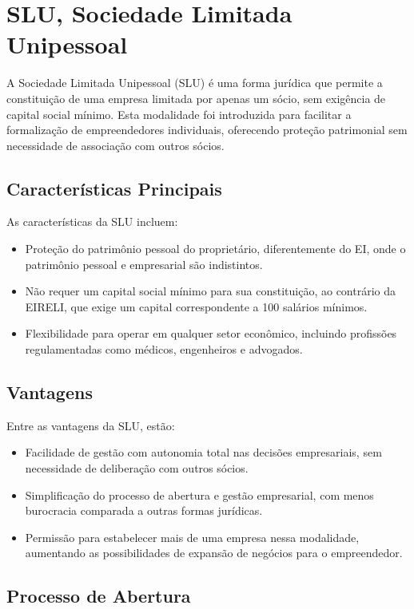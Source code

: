 \section{SLU, Sociedade Limitada Unipessoal}

A Sociedade Limitada Unipessoal (SLU) é uma forma jurídica que permite a constituição de uma empresa limitada por apenas um sócio, sem exigência de capital social mínimo. Esta modalidade foi introduzida para facilitar a formalização de empreendedores individuais, oferecendo proteção patrimonial sem necessidade de associação com outros sócios.

\subsection{Características Principais}

As características da SLU incluem:
\begin{itemize}
    \item Proteção do patrimônio pessoal do proprietário, diferentemente do EI, onde o patrimônio pessoal e empresarial são indistintos.
    \item Não requer um capital social mínimo para sua constituição, ao contrário da EIRELI, que exige um capital correspondente a 100 salários mínimos.
    \item Flexibilidade para operar em qualquer setor econômico, incluindo profissões regulamentadas como médicos, engenheiros e advogados.
\end{itemize}

\subsection{Vantagens}

Entre as vantagens da SLU, estão:
\begin{itemize}
    \item Facilidade de gestão com autonomia total nas decisões empresariais, sem necessidade de deliberação com outros sócios.
    \item Simplificação do processo de abertura e gestão empresarial, com menos burocracia comparada a outras formas jurídicas.
    \item Permissão para estabelecer mais de uma empresa nessa modalidade, aumentando as possibilidades de expansão de negócios para o empreendedor.
\end{itemize}

\subsection{Processo de Abertura}

